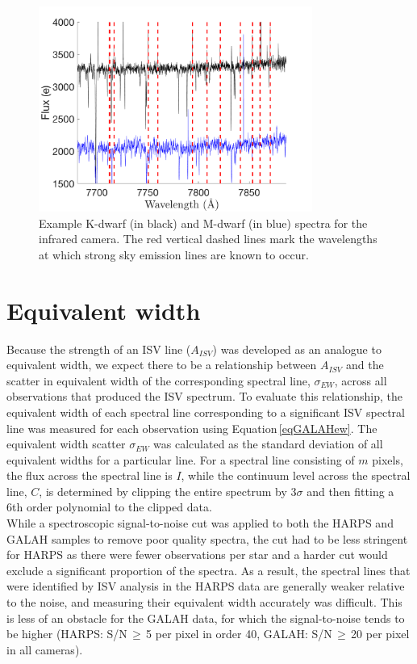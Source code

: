 \begin{figure}
    \centering
    \captionsetup{width=.8\textwidth}
    \includegraphics[width=0.8\textwidth]{GALAHskyemission.png}
    \caption{Example K-dwarf (in black) and M-dwarf (in blue) spectra for the infrared camera. The red vertical dashed lines mark the wavelengths at which strong sky emission lines are known to occur.}
    \label{figCamera4emission}
\end{figure}

\section{Equivalent width}
\label{secGALAHew}
Because the strength of an ISV line ($A_{ISV}$) was developed as an analogue to equivalent width, we expect there to be a relationship between $A_{ISV}$ and the scatter in equivalent width of the corresponding spectral line, $\sigma_{EW}$, across all observations that produced the ISV spectrum. To evaluate this relationship, the equivalent width of each spectral line corresponding to a significant ISV spectral line was measured for each observation using Equation\,\ref{eqGALAHew}. The equivalent width scatter $\sigma_{EW}$ was calculated as the standard deviation of all equivalent widths for a particular line. For a spectral line consisting of $m$ pixels, the flux across the spectral line is $I$, while the continuum level across the spectral line, $C$, is determined by clipping the entire spectrum by 3$\sigma$ and then fitting a 6th order polynomial to the clipped data.\\

While a spectroscopic signal-to-noise cut was applied to both the HARPS and GALAH samples to remove poor quality spectra, the cut had to be less stringent for HARPS as there were fewer observations per star and a harder cut would exclude a significant proportion of the spectra. As a result, the spectral lines that were identified by ISV analysis in the HARPS data are generally weaker relative to the noise, and measuring their equivalent width accurately was difficult. This is less of an obstacle for the GALAH data, for which the signal-to-noise tends to be higher (HARPS: S/N\,$\geq$\,5 per pixel in order 40, GALAH: S/N\,$\geq$\,20 per pixel in all cameras).\\

